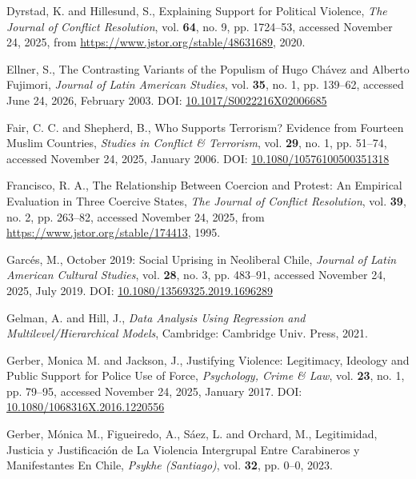 \documentclass[
  13pt,
]{article}
\newlength{\cslhangindent}
\newenvironment{CSLReferences}[2] %
 {\begin{list}{}{%
  \setlength{\itemindent}{0pt}
  \setlength{\leftmargin}{0pt}
  \setlength{\parsep}{0pt}
  \ifodd #1
   \setlength{\leftmargin}{\cslhangindent}
   \setlength{\itemindent}{-1\cslhangindent}
  \fi
  \setlength{\itemsep}{#2\baselineskip}}}
 {\end{list}}
\begin{document}
\begin{CSLReferences}{1}{0}
Dyrstad, K. and Hillesund, S., Explaining {Support} for {Political
Violence}, \emph{The Journal of Conflict Resolution}, vol. \textbf{64},
no. 9, pp. 1724--53, accessed November 24, 2025, from
\url{https://www.jstor.org/stable/48631689}, 2020.

Ellner, S., The {Contrasting Variants} of the {Populism} of {Hugo
Chávez} and {Alberto Fujimori}, \emph{Journal of Latin American
Studies}, vol. \textbf{35}, no. 1, pp. 139--62, accessed June 24, 2026,
February 2003. DOI:
\href{https://doi.org/10.1017/S0022216X02006685}{10.1017/S0022216X02006685}

Fair, C. C. and Shepherd, B., Who {Supports Terrorism}? {Evidence} from
{Fourteen Muslim Countries}, \emph{Studies in Conflict \& Terrorism},
vol. \textbf{29}, no. 1, pp. 51--74, accessed November 24, 2025, January
2006. DOI:
\href{https://doi.org/10.1080/10576100500351318}{10.1080/10576100500351318}

Francisco, R. A., The {Relationship} Between {Coercion} and {Protest}:
{An Empirical Evaluation} in {Three Coercive States}, \emph{The Journal
of Conflict Resolution}, vol. \textbf{39}, no. 2, pp. 263--82, accessed
November 24, 2025, from \url{https://www.jstor.org/stable/174413}, 1995.

Garcés, M., October 2019: {Social Uprising} in {Neoliberal Chile},
\emph{Journal of Latin American Cultural Studies}, vol. \textbf{28}, no.
3, pp. 483--91, accessed November 24, 2025, July 2019. DOI:
\href{https://doi.org/10.1080/13569325.2019.1696289}{10.1080/13569325.2019.1696289}

Gelman, A. and Hill, J., \emph{Data Analysis Using Regression and
Multilevel/Hierarchical Models}, Cambridge: Cambridge Univ. Press, 2021.

Gerber, Monica M. and Jackson, J., Justifying Violence: Legitimacy,
Ideology and Public Support for Police Use of Force, \emph{Psychology,
Crime \& Law}, vol. \textbf{23}, no. 1, pp. 79--95, accessed November
24, 2025, January 2017. DOI:
\href{https://doi.org/10.1080/1068316X.2016.1220556}{10.1080/1068316X.2016.1220556}

Gerber, Mónica M., Figueiredo, A., Sáez, L. and Orchard, M.,
Legitimidad, {Justicia} y {Justificación} de La {Violencia Intergrupal}
Entre {Carabineros} y {Manifestantes} En {Chile}, \emph{Psykhe
(Santiago)}, vol. \textbf{32}, pp. 0--0, 2023.


\end{CSLReferences}
\end{document}
